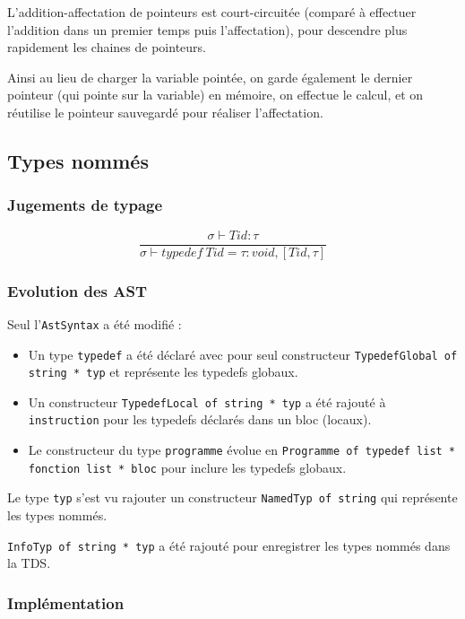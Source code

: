 \documentclass[headings=standardclasses,parskip=half]{scrartcl}
\begin{document}
L'addition-affectation de pointeurs est court-circuitée
(comparé à effectuer l'addition dans un premier temps
puis l'affectation), pour descendre plus rapidement les chaines
de pointeurs.

Ainsi au lieu de charger la variable pointée,
on garde également le dernier pointeur (qui pointe sur la variable)
en mémoire, on effectue le calcul, et on réutilise
le pointeur sauvegardé pour réaliser l'affectation.

\subsection{Types nommés}

\subsubsection*{Jugements de typage}

\[\frac{\sigma \vdash Tid : \tau}
    {\sigma \vdash typedef\ Tid = \tau : void, [Tid,\tau]}\]

\subsubsection*{Evolution des AST}

Seul l'\texttt{AstSyntax} a été modifié :

\begin{itemize}
    \item Un type \texttt{typedef} a été déclaré avec pour seul
          constructeur \texttt{TypedefGlobal of string * typ} et
          représente les typedefs globaux.
    \item Un constructeur \texttt{TypedefLocal of string * typ} a
          été rajouté à \texttt{instruction} pour les typedefs
          déclarés dans un bloc (locaux).
    \item Le constructeur du type \texttt{programme} évolue en
          \texttt{Programme of typedef list * fonction list * bloc}
          pour inclure les typedefs globaux.
\end{itemize}

Le type \texttt{typ} s'est vu rajouter un constructeur
\texttt{NamedTyp of string} qui représente les types nommés.

\texttt{InfoTyp of string * typ} a été rajouté pour enregistrer
les types nommés dans la TDS.

\subsubsection*{Implémentation}
\end{document}
